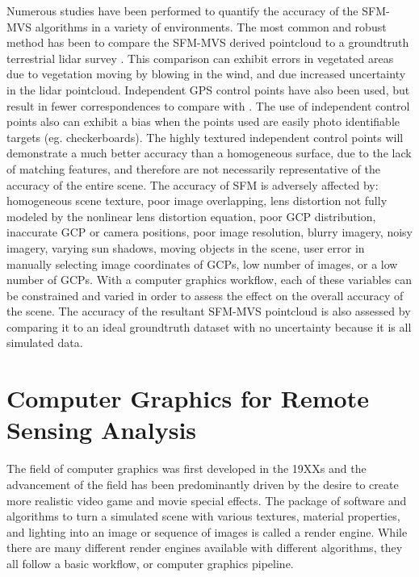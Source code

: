 Numerous studies have been performed to quantify the accuracy of the SFM-MVS algorithms in a variety of environments.  The most common and robust method has been to compare the SFM-MVS derived pointcloud to a groundtruth terrestrial lidar survey .  This comparison can exhibit errors in vegetated areas due to vegetation moving by blowing in the wind, and due increased uncertainty in the lidar pointcloud.  Independent GPS control points have also been used, but result in fewer correspondences to compare with .  The use of independent control points also can exhibit a bias when the points used are easily photo identifiable targets (eg. checkerboards).  The highly textured independent control points will demonstrate a much better accuracy than a homogeneous surface, due to the lack of matching features, and therefore are not necessarily representative of the accuracy of the entire scene.  The accuracy of SFM is adversely affected by: homogeneous scene texture, poor image overlapping, lens distortion not fully modeled by the nonlinear lens distortion equation, poor GCP distribution, inaccurate GCP or camera positions, poor image resolution, blurry imagery, noisy imagery, varying sun shadows, moving objects in the scene, user error in manually selecting image coordinates of GCPs, low number of images, or a low number of GCPs.  With a computer graphics workflow, each of these variables can be constrained and varied in order to assess the effect on the overall accuracy of the scene.  The accuracy of the resultant SFM-MVS pointcloud is also assessed by comparing it to an ideal groundtruth dataset with no uncertainty because it is all simulated data.  

\section{Computer Graphics for Remote Sensing Analysis}

The field of computer graphics was first developed in the 19XXs and the advancement of the field has been predominantly driven by the desire to create more realistic video game and movie special effects.   The package of software and algorithms to turn a simulated scene with various textures, material properties, and lighting into an image or sequence of images is called a render engine.  While there are many different render engines available with different algorithms, they all follow a basic workflow, or computer graphics pipeline.  

